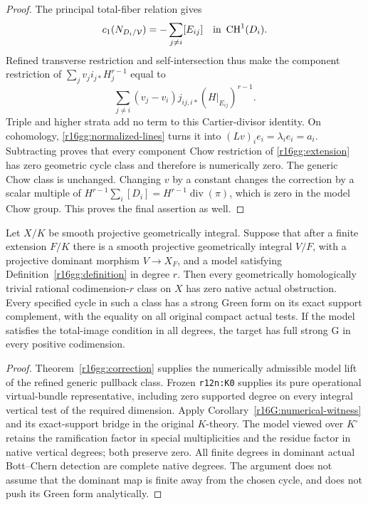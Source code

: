 \begin{proof}
The principal total-fiber relation gives
\[
 c_1(N_{D_i/\mathcal V})=-\sum_{j\ne i}[E_{ij}]
                         \quad\hbox{in }\operatorname{CH}^1(D_i).
\]
Refined transverse restriction and self-intersection thus make
the component restriction of $\sum_jv_j i_{j*}H_j^{r-1}$ equal to
\[
              \sum_{j\ne i}(v_j-v_i)
                      j_{ij,i*}(H|_{E_{ij}})^{r-1}.
 \tag{GG16.12}\label{r16gg:vertical-restrictions}
\]
Triple and higher strata add no term to this Cartier-divisor
identity. On cohomology, \eqref{r16gg:normalized-lines} turns
it into $(Lv)_ie_i=\lambda_i e_i=a_i$.
Subtracting proves that every component Chow restriction of
\eqref{r16gg:extension} has zero geometric cycle class and
therefore is numerically zero. The generic Chow class is
unchanged. Changing $v$ by a constant changes the correction
by a scalar multiple of
$H^{r-1}\sum_i[D_i]=H^{r-1}\operatorname{div}(\pi)$,
which is zero in the model Chow group. This proves the final
assertion as well.
\end{proof}

\begin{corollary}
\label{r16gg:actual}
Let $X/K$ be smooth projective geometrically integral. Suppose
that after a finite extension $F/K$ there is a smooth projective
geometrically integral $V/F$, with a projective dominant morphism
$V\to X_F$, and a model satisfying
Definition~\ref{r16gg:definition} in degree $r$.
Then every geometrically homologically trivial rational
codimension-$r$ class on $X$ has zero native actual obstruction.
Every specified cycle in such a class has a strong Green form
on its exact support complement, with the equality on all
original compact actual tests. If the model satisfies the
total-image condition in all degrees, the target has full
strong G in every positive codimension.
\end{corollary}

\begin{proof}
Theorem~\ref{r16gg:correction} supplies the numerically
admissible model lift of the refined generic pullback class.
Frozen \texttt{r12n:K0} supplies its pure operational
virtual-bundle representative, including zero supported
degree on every integral vertical test of the required
dimension. Apply Corollary~\ref{r16G:numerical-witness}
and its exact-support bridge in the original $K$-theory.
The model viewed over $K^\circ$ retains the ramification
factor in special multiplicities and the residue factor
in native vertical degrees; both preserve zero. All finite
degrees in dominant actual Bott--Chern detection are complete
native degrees. The argument does not assume that the
dominant map is finite away from the chosen cycle, and
does not push its Green form analytically.
\end{proof}

